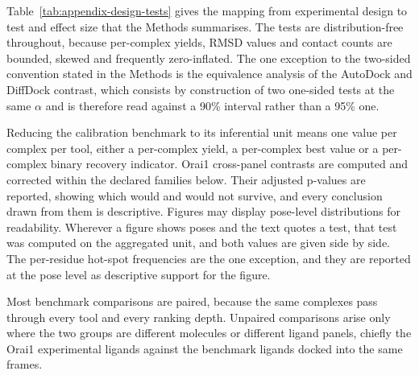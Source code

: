Table~\ref{tab:appendix-design-tests} gives the mapping from experimental design to test and effect size that the Methods summarises. The tests are distribution-free throughout, because per-complex yields, RMSD values and contact counts are bounded, skewed and frequently zero-inflated. The one exception to the two-sided convention stated in the Methods is the equivalence analysis of the AutoDock and DiffDock contrast, which consists by construction of two one-sided tests at the same \ensuremath{\alpha} and is therefore read against a 90\% interval rather than a 95\% one.

Reducing the calibration benchmark to its inferential unit means one value per complex per tool, either a per-complex yield, a per-complex best value or a per-complex binary recovery indicator. Orai1 cross-panel contrasts are computed and corrected within the declared families below. Their adjusted p-values are reported, showing which would and would not survive, and every conclusion drawn from them is descriptive. Figures may display pose-level distributions for readability. Wherever a figure shows poses and the text quotes a test, that test was computed on the aggregated unit, and both values are given side by side. The per-residue hot-spot frequencies are the one exception, and they are reported at the pose level as descriptive support for the figure.

Most benchmark comparisons are paired, because the same complexes pass through every tool and every ranking depth. Unpaired comparisons arise only where the two groups are different molecules or different ligand panels, chiefly the Orai1 experimental ligands against the benchmark ligands docked into the same frames.

